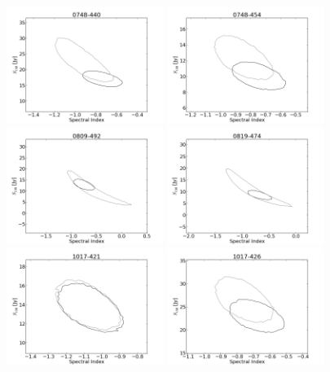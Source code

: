 \documentclass[preprint]{aastex}
\begin{document}
\begin{figure}[htbp]
\begin{center}
\includegraphics[width=2in]{plots/0748-440_SI_MCMC.png} %
\includegraphics[width=2in]{plots/0748-454_SI_MCMC.png} %
\includegraphics[width=2in]{plots/0809-492_SI_MCMC.png} %
\includegraphics[width=2in]{plots/0819-474_SI_MCMC.png} %
\includegraphics[width=2in]{plots/1017-421_SI_MCMC.png} %
\includegraphics[width=2in]{plots/1017-426_SI_MCMC.png} %

\end{center}
\end{figure}
\end{document}
